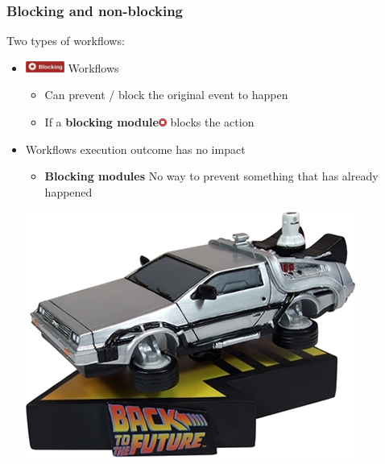 \begin{frame}
    \frametitle{Blocking and non-blocking}
    Two types of workflows:
    \vspace{0.5em}
    \begin{itemize}
        \item[] \hspace*{-2em}\includegraphics[width=48px]{pictures/blocking-workflow.png} Workflows
        \begin{itemize}
            \item Can prevent / block the original event to happen
            \item If a \textbf{blocking module}\includegraphics[width=10px]{pictures/blocking-module.png} blocks the action
        \end{itemize}
        \vspace{0.5em}
        \item[] \hspace*{-2em}{\bf Regular} Workflows execution outcome has no impact
        \begin{itemize}
            \item \textbf{Blocking modules} No way to prevent something that has already happened
        \end{itemize}
        \begin{center}
            \includegraphics[width=0.4\linewidth]{pictures/time-machine.png}
        \end{center}
    \end{itemize}
\end{frame}

